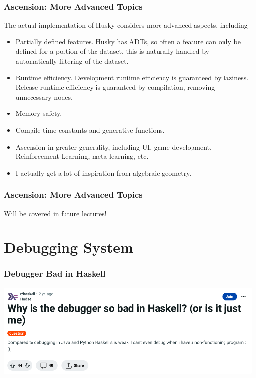 \documentclass{beamer}   	%
\theoremstyle{definition}
\begin{document}
\begin{frame}
\frametitle{Ascension: More Advanced Topics}

The actual implementation of Husky considers more advanced aspects, including

\begin{itemize}
	\item Partially defined features. Husky has ADTs, so often a feature can only be defined for a portion of the dataset, this is naturally handled by automatically filtering of the dataset.
	\item Runtime efficiency. Development runtime efficiency is guaranteed by laziness. Release runtime efficiency is guaranteed by compilation, removing unnecessary nodes.
	\item Memory safety.
	\item Compile time constants and generative functions.
	\item Ascension in greater generality, including UI, game development, Reinforcement Learning, meta learning, etc.
	\item I actually get a lot of inspiration from algebraic geometry.
\end{itemize}

\end{frame}

\begin{frame}
\frametitle{Ascension: More Advanced Topics}
Will be covered in future lectures!
\end{frame}

\section{Debugging System}

\begin{frame}
\frametitle{Debugger Bad in Haskell}
	\includegraphics[width=\linewidth]{snapshots/haskell_debugging_is_hard00.png}
\end{frame}
\end{document}
